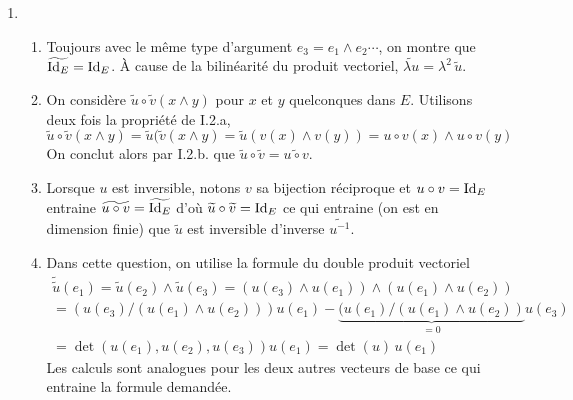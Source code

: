 \begin{enumerate}
\begin{enumerate}
 \item 
 Comme la base $\mathcal{B}$ est orthonormée directe, $e_3=e_1\wedge e_2$ donc
\begin{displaymath}
 \widetilde{u}(e_1\wedge e_2)=\widetilde{u}(e_3)= u(e_1)\wedge u(e_2)
\end{displaymath}
 On raisonne de même avec $e_1=e_2\wedge e_3$ et $e_2=e_3\wedge e_1$. En utilisant le caractère bilinéaire antisymétrique du produit vectoriel et la linéarité de $u$, on déduit la formule $\widetilde{u}(x\wedge y)=u(x)\wedge u(y)$ pour tous les vecteurs $x$ et $y$.
\item En utilisant la propriété que doit vérifier $v$ pour les couples $(x,y)$ égaux respectivement à $(e_2,e_3)$, $(e_3,e_1)$ et $(e_1,e_2)$ on montre que $v$ et $\widetilde{u}$ coïncident sur la base $\mathcal{B}$. Comme les applications sont linéaires, elles sont égales.
\end{enumerate}

 \item
\begin{enumerate}
 \item Toujours avec le même type d'argument $e_3 = e_1\wedge e_2 \cdots$, on montre que $\widetilde{\operatorname{Id}_E}=\operatorname{Id}_E$. \newline
 \`A cause de la bilinéarité du produit vectoriel, $\widetilde{\lambda u} = \lambda^2 \,\widetilde{u}$. 
 \item On considère $\widetilde{u}\circ\widetilde{v}(x\wedge y)$ pour $x$ et $y$ quelconques dans $E$.\newline
Utilisons deux fois la propriété de I.2.a,
\begin{displaymath}
 \widetilde{u}\circ \widetilde{v}(x\wedge y) =
\widetilde{u}(\widetilde{v}(x\wedge y) = \widetilde{u}(v(x)\wedge v(y))
= u\circ v(x) \wedge u\circ v(y)
\end{displaymath}
On conclut alors par I.2.b. que $\widetilde{u}\circ \widetilde{v} = \widetilde{u\circ v}$.
 \item Lorsque $u$ est inversible, notons $v$ sa bijection réciproque et $u\circ v = \operatorname{Id}_E$ entraine $\widetilde{u\circ v} = \widetilde{\operatorname{Id}_E}$ d'où $\widetilde{u}\circ \widetilde{v} = \operatorname{Id}_E$ ce qui entraine (on est en dimension finie) que $\widetilde{u}$ est inversible d'inverse $\widetilde{u^{-1}}$. 
 \item Dans cette question, on utilise la formule du double produit vectoriel
\begin{multline*}
 \widetilde{\widetilde{u}}(e_1) = \widetilde{u}(e_2)\wedge \widetilde{u}(e_3) 
= \left( u(e_3)\wedge u(e_1)\right) \wedge \left( u(e_1)\wedge u(e_2)\right)\\
= (u(e_3)/ \left( u(e_1)\wedge u(e_2)\right))u(e_1) 
- \underset{=0}{\underbrace{(u(e_1)/\left( u(e_1)\wedge u(e_2)\right)}}u(e_3)\\
=\det(u(e_1),u(e_2),u(e_3))u(e_1) = \det(u)\, u(e_1)
\end{multline*}
Les calculs sont analogues pour les deux autres vecteurs de base ce qui entraine la formule demandée.
\end{enumerate}
 

\end{enumerate}

